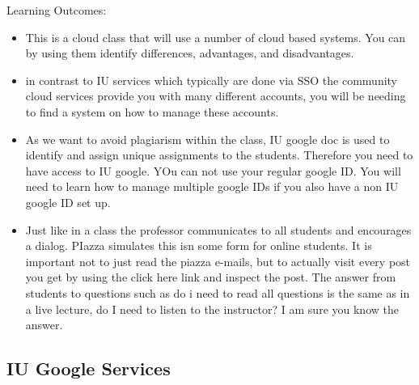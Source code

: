 Learning Outcomes:
\begin{itemize}
\item This is a cloud class that will use a number of cloud based
  systems. You can by using them identify differences, advantages, and
  disadvantages.
\item in contrast to IU services which typically are done via SSO the
  community cloud services provide you with many different accounts,
  you will be needing to find a system on how to manage these
  accounts.
\item As we want to avoid plagiarism within the class, IU google doc
  is used to identify and assign unique assignments to the
  students. Therefore you need to have access to IU google. YOu can
  not use your regular google ID. You will need to learn how to manage
  multiple google IDs if you also have a non IU google ID set up.
\item Just like in a class the professor communicates to all students
  and encourages a dialog. PIazza simulates this isn some form for
  online students. It is important not to just read the piazza
  e-mails, but to actually visit every post you get by using the click
  here link and inspect the post. The answer from students to
  questions such as do i need to read all questions is the same as in
  a live lecture, do I need to listen to the instructor? I am sure you
  know the answer.
\end{itemize}

\subsection{IU Google Services}
\label{E:e616-iu-google-services}


